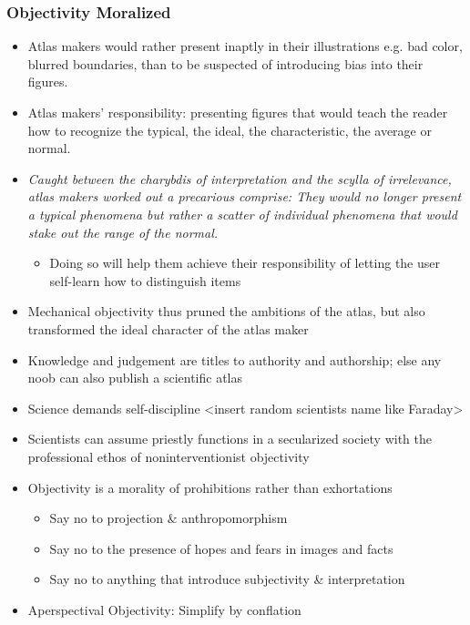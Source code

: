 \documentclass[a4paper]{article}
\begin{document}
\subsubsection{Objectivity Moralized}
\begin{itemize}
	\item Atlas makers would rather present inaptly in their illustrations e.g. bad color, blurred boundaries, than to be suspected of introducing bias into their figures.
	\item Atlas makers' responsibility: presenting figures that would teach the reader how to recognize the typical, the ideal, the characteristic, the average or normal.
	\item \textit{Caught between the charybdis of interpretation and the scylla of irrelevance, atlas makers worked out a precarious comprise: They would no longer present a typical phenomena but rather a scatter of individual phenomena that would stake out the range of the normal.}
	\begin{itemize}[label=$\circ$]
		\item Doing so will help them achieve their responsibility of letting the user self-learn how to distinguish items
	\end{itemize}
	\item Mechanical objectivity thus pruned the ambitions of the atlas, but also transformed the ideal character of the atlas maker
	\item Knowledge and judgement are titles to authority and authorship; else any noob can also publish a scientific atlas
	\item Science demands self-discipline <insert random scientists name like Faraday>
	\item Scientists can assume priestly functions in a secularized society with the professional ethos of noninterventionist objectivity
	\item Objectivity is a morality of prohibitions rather than exhortations
	\begin{itemize}[label=$\circ$]
		\item Say no to projection \& anthropomorphism
		\item Say no to the presence of hopes and fears in images and facts
		\item Say no to anything that introduce subjectivity \& interpretation
	\end{itemize}
	\item Aperspectival Objectivity: Simplify by conflation
\end{itemize}
\end{document}
